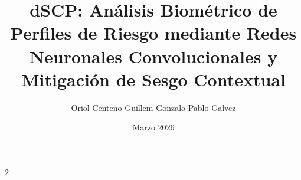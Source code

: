 \documentclass[a4paper,10pt]{article}
\title{\bfseries dSCP: Análisis Biométrico de Perfiles de Riesgo mediante Redes Neuronales Convolucionales y Mitigación de Sesgo Contextual}
\author{Oriol Centeno \quad Guillem Gonzalo \quad Pablo Galvez}
\date{Marzo 2026}
\begin{document}
\maketitle



\begin{multicols}{2}

\end{multicols}
\end{document}
